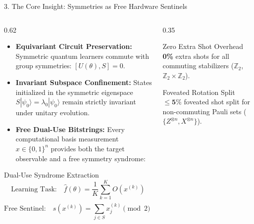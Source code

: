 \documentclass[aspectratio=169, 10pt]{beamer}
\begin{document}
\begin{frame}{3. The Core Insight: Symmetries as Free Hardware Sentinels}
    \begin{columns}[T]
        \begin{column}{0.62\textwidth}
            \begin{itemize}
                \item \textbf{Equivariant Circuit Preservation:} Symmetric quantum learners commute with group symmetries: $[U(\theta), S] = 0$.
                \item \textbf{Invariant Subspace Confinement:} States initialized in the symmetric eigenspace $S|\psi_0\rangle = \lambda_0 |\psi_0\rangle$ remain strictly invariant under unitary evolution.
                \item \textbf{Free Dual-Use Bitstrings:} Every computational basis measurement $x \in \{0, 1\}^n$ provides both the target observable and a free symmetry syndrome:
            \end{itemize}
            \vspace{0.2cm}
            \begin{block}{Dual-Use Syndrome Extraction}
                $$\text{Learning Task:} \quad \hat{f}(\theta) = \frac{1}{K} \sum_{k=1}^K O(x^{(k)})$$
                $$\text{Free Sentinel:} \quad s(x^{(k)}) = \sum_{j \in S} x_j^{(k)} \pmod 2 \implies \nu_t = \frac{1}{K} \sum_{k=1}^K s(x^{(k)})$$
            \end{block}
        \end{column}
        \begin{column}{0.35\textwidth}
            \begin{exampleblock}{Zero Extra Shot Overhead}
                \textbf{0\%} extra shots for all commuting stabilizers ($\mathbb{Z}_2$, $\mathbb{Z}_2 \times \mathbb{Z}_2$).
            \end{exampleblock}
            \vspace{0.3cm}
            \begin{exampleblock}{Foveated Rotation Split}
                $\le \mathbf{5\%}$ foveated shot split for non-commuting Pauli sets ($\{Z^{\otimes n}, X^{\otimes n}\}$).
            \end{exampleblock}
        \end{column}
    \end{columns}
\end{frame}
\end{document}
